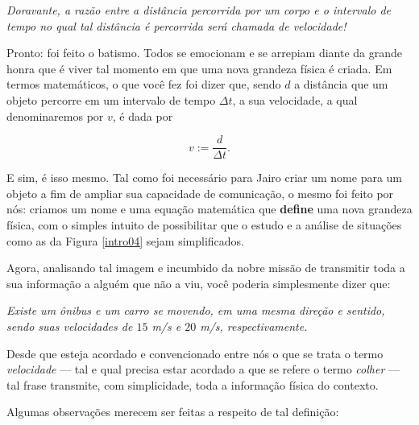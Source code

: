 \begin{center}
    \textit{Doravante, a razão entre a distância percorrida por um corpo e o intervalo de tempo no qual tal distância é percorrida será chamada de velocidade!}
\end{center}

Pronto: foi feito o batismo. Todos se emocionam e se arrepiam diante da grande honra que é viver tal momento em que uma nova grandeza física é criada. Em termos matemáticos, o que você fez foi dizer que, sendo $d$ a distância que um objeto percorre em um intervalo de tempo $\Delta t$, a sua velocidade, a qual denominaremos por $v$, é dada por

\begin{equation}
   \boxed{ v := \dfrac{d}{\Delta t}.}
   \label{00intro_eq_velocidade}
\end{equation}

E sim, é isso mesmo. Tal como foi necessário para Jairo criar um nome para um objeto a fim de ampliar sua capacidade de comunicação, o mesmo foi feito por nós: criamos um nome e uma equação matemática que \textbf{define} uma nova grandeza física, com o simples intuito de possibilitar que o estudo e a análise de situações como as da Figura \ref{intro04} sejam simplificados. 

Agora, analisando tal imagem e incumbido da nobre missão de transmitir toda a sua informação a alguém que não a viu, você poderia simplesmente dizer que:

\textit{Existe um ônibus e um carro se movendo, em uma mesma direção e sentido, sendo suas velocidades de $15$ m/s e $20$ m/s, respectivamente.}

Desde que esteja acordado e convencionado entre nós o que se trata o termo \textit{velocidade} --- tal e qual precisa estar acordado a que se refere o termo \textit{colher} --- tal frase transmite, com simplicidade, toda a informação física do contexto.



Algumas observações merecem ser feitas a respeito de tal definição:

